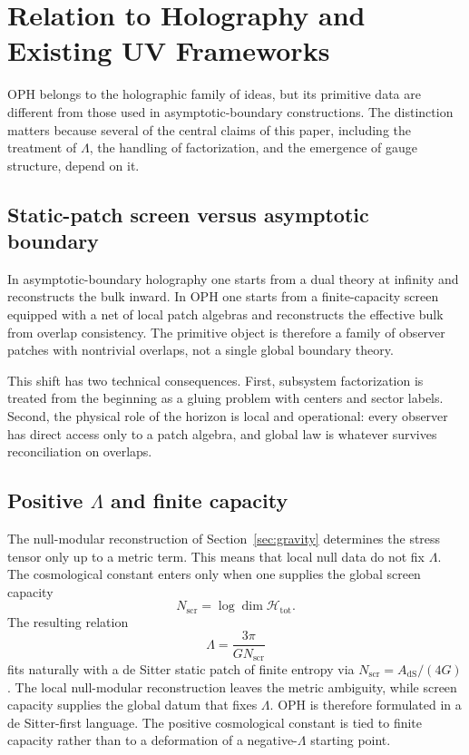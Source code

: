 \documentclass[11pt]{article}
\begin{document}
\section{Relation to Holography and Existing UV Frameworks}

OPH belongs to the holographic family of ideas, but its primitive data are different from those used in asymptotic-boundary constructions. The distinction matters because several of the central claims of this paper, including the treatment of $\Lambda$, the handling of factorization, and the emergence of gauge structure, depend on it.

\subsection{Static-patch screen versus asymptotic boundary}

In asymptotic-boundary holography one starts from a dual theory at infinity and reconstructs the bulk inward. In OPH one starts from a finite-capacity screen equipped with a net of local patch algebras and reconstructs the effective bulk from overlap consistency. The primitive object is therefore a family of observer patches with nontrivial overlaps, not a single global boundary theory.

This shift has two technical consequences. First, subsystem factorization is treated from the beginning as a gluing problem with centers and sector labels. Second, the physical role of the horizon is local and operational: every observer has direct access only to a patch algebra, and global law is whatever survives reconciliation on overlaps.

\subsection{Positive $\Lambda$ and finite capacity}

The null-modular reconstruction of Section~\ref{sec:gravity} determines the stress tensor only up to a metric term. This means that local null data do not fix $\Lambda$. The cosmological constant enters only when one supplies the global screen capacity
\[
N_{\mathrm{scr}}=\log\dim\mathcal H_{\mathrm{tot}}.
\]
The resulting relation
\[
\Lambda=\frac{3\pi}{G N_{\mathrm{scr}}}
\]
fits naturally with a de Sitter static patch of finite entropy via $N_{\mathrm{scr}}=A_{\mathrm{dS}}/(4G)$. The local null-modular reconstruction leaves the metric ambiguity, while screen capacity supplies the global datum that fixes \(\Lambda\). OPH is therefore formulated in a de Sitter-first language. The positive cosmological constant is tied to finite capacity rather than to a deformation of a negative-$\Lambda$ starting point.
\end{document}
